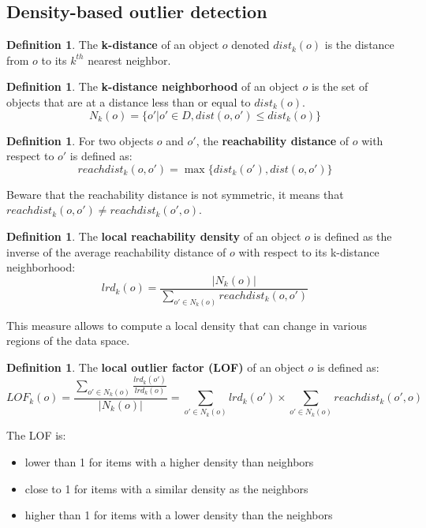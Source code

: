\documentclass[12pt, openany]{report}
\theoremstyle{definition}
\newtheorem{definition}[thm]{Definition}
\begin{document}
\subsection{Density-based outlier detection}
\begin{definition}
    The \textbf{k-distance} of an object $o$ denoted $dist_k(o)$ is the distance from $o$ to its $k^{th}$ nearest neighbor. 
\end{definition}
\begin{definition}
    The \textbf{k-distance neighborhood} of an object $o$ is the set of objects that are at a distance less than or equal to $dist_k(o)$.
    \begin{equation}
        N_k(o) = \{o' | o' \in D, dist(o, o') \leq dist_k(o)\}
    \end{equation}
\end{definition}
\begin{definition}
    For two objects $o$ and $o'$, the \textbf{reachability distance} of $o$ with respect to $o'$ is defined as:
    \begin{equation}           
        reachdist_k(o, o') = \max\{dist_k(o'), dist(o, o')\}
    \end{equation}
\end{definition}
Beware that the reachability distance is not symmetric, it means that $reachdist_k(o, o') \neq reachdist_k(o', o)$.
\begin{definition}
    The \textbf{local reachability density} of an object $o$ is defined as the inverse of the average reachability distance of $o$ with respect to its k-distance neighborhood:
    \begin{equation}
        lrd_k(o) = \frac{|N_k(o)|}{\sum_{o' \in N_k(o)} reachdist_k(o, o')}
    \end{equation}
\end{definition}
This measure allows to compute a local density that can change in various regions of the data space.
\begin{definition}
    The \textbf{local outlier factor (LOF)} of an object $o$ is defined as:
    \begin{equation}
        LOF_k(o) = \frac{\sum_{o' \in N_k(o)} \frac{lrd_k(o')}{lrd_k(o)}}{|N_k(o)|} = \sum_{o' \in N_k(o)} lrd_k(o') \times \sum_{o' \in N_k(o)} reachdist_k(o', o)
    \end{equation} 
\end{definition}
The LOF is:
\begin{itemize}
    \item lower than 1 for items with a higher density than neighbors
    \item close to 1 for items with a similar density as the neighbors
    \item higher than 1 for items with a lower density than the neighbors
\end{itemize}
\end{document}
